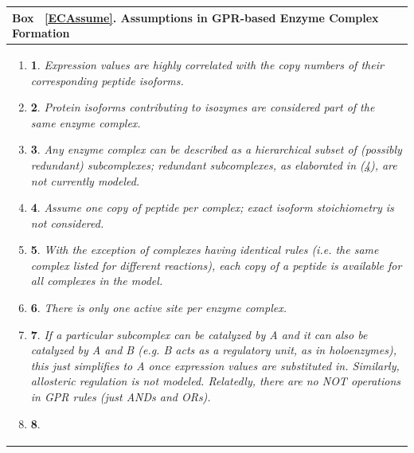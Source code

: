\documentclass[phd,tocprelim]{cornell}
\theoremstyle{break}
\theoremstyle{empty}
\newtheorem{assume}{}
\begin{document}
\label{ECAssume}
\begin{center}
\begin{tabular}{| p{14cm} |}
\hline
\textbf{Box ~\ref{ECAssume}. Assumptions in GPR-based Enzyme Complex Formation} \\
\hline
\begin{enumerate}
\item \begin{assume} \label{ass:expcorr}
Expression values are highly correlated with the copy numbers of their
corresponding peptide isoforms.
\end{assume}
\item \begin{assume} \label{ass:isozyme} 
Protein isoforms contributing to isozymes are considered part of the
same enzyme complex.
\end{assume}
\item \begin{assume} \label{ass:hierarchy}
Any enzyme complex can be described as a hierarchical subset of
(possibly redundant) subcomplexes; redundant subcomplexes, as
elaborated in (\ref{ass:nostoich}), are not currently modeled.
\end{assume}
\item \begin{assume} \label{ass:nostoich} 
Assume one copy of peptide per complex; exact isoform stoichiometry
is not considered.
\end{assume}
\item \begin{assume} \label{ass:sharing} 
With the exception of complexes having identical rules (i.e. the same
complex listed for different reactions), each copy of a peptide
is available for all complexes in the model.
\end{assume}
\item \begin{assume} \label{ass:active_site}
There is only one active site per enzyme complex.
\end{assume}
\item \begin{assume} \label{ass:holo} 
If a particular subcomplex can be catalyzed by A and it can also be
catalyzed by A and B (e.g. B acts as a regulatory unit, as in
holoenzymes), this just simplifies to A once expression values are
substituted in. Similarly, allosteric regulation is not
modeled. Relatedly, there are no NOT operations in GPR rules (just ANDs
and ORs).
\end{assume}
\item \begin{assume} \label{ass:chap} 

\end{assume}
\end{enumerate}
\end{tabular}
\end{center}
\end{document}
